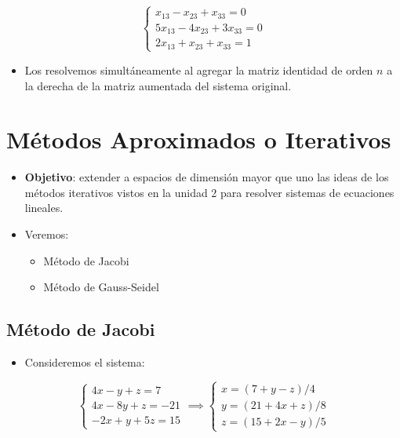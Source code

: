 \documentclass[]{book}
\providecommand{\tightlist}{%
  \setlength{\itemsep}{0pt}\setlength{\parskip}{0pt}}
\begin{document}
\[
\begin{cases} 
x_{13}-x_{23}+x_{33}=0 \\
5x_{13}-4x_{23}+3x_{33}=0 \\
2x_{13}+x_{23}+x_{33}=1
\end{cases}
\]

\begin{itemize}
\tightlist
\item
  Los resolvemos simultáneamente al agregar la matriz identidad de orden \(n\) a la derecha de la matriz aumentada del sistema original.
\end{itemize}

\hypertarget{muxe9todos-aproximados-o-iterativos}{%
\section{Métodos Aproximados o Iterativos}\label{muxe9todos-aproximados-o-iterativos}}

\begin{itemize}
\item
  \textbf{Objetivo}: extender a espacios de dimensión mayor que uno las ideas de los métodos iterativos vistos en la unidad 2 para resolver sistemas de ecuaciones lineales.
\item
  Veremos:

  \begin{itemize}
  \tightlist
  \item
    Método de Jacobi
  \item
    Método de Gauss-Seidel
  \end{itemize}
\end{itemize}

\hypertarget{muxe9todo-de-jacobi}{%
\subsection{Método de Jacobi}\label{muxe9todo-de-jacobi}}

\begin{itemize}
\tightlist
\item
  Consideremos el sistema:
\end{itemize}

\[
\begin{cases} 
4x-y+z=7 \\
4x-8y+z=-21 \\
-2x+y+5z=15
\end{cases}
\implies
\begin{cases} 
x=(7+y-z)/4 \\
y=(21+4x+z)/8 \\
z=(15+2x-y)/5
\end{cases}
\]
\end{document}
